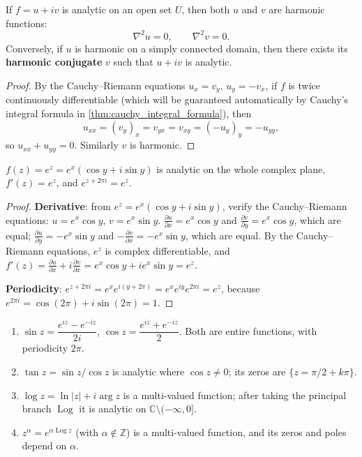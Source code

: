 \begin{corollary}\label{cor:harmonic_parts}
If $f = u + iv$ is analytic on an open set $U$, then both $u$ and $v$ are harmonic functions:
\[
\nabla^2 u = 0, \qquad \nabla^2 v = 0.
\]
Conversely, if $u$ is harmonic on a simply connected domain, then there exists its \textbf{harmonic conjugate} $v$ such that $u + iv$ is analytic.
\end{corollary}

\begin{proof}
By the Cauchy--Riemann equations $u_x = v_y$, $u_y = -v_x$, if $f$ is twice continuously differentiable (which will be guaranteed automatically by Cauchy's integral formula in \cref{thm:cauchy_integral_formula}), then
\[
u_{xx} = (v_y)_x = v_{yx} = v_{xy} = (-u_y)_y = -u_{yy},
\]
so $u_{xx} + u_{yy} = 0$. Similarly $v$ is harmonic.
\end{proof}

\begin{proposition}\label{prop:complex_exp_periodicity}
$f(z) = e^z = e^x(\cos y + i\sin y)$ is analytic on the whole complex plane, $f'(z) = e^z$, and $e^{z + 2\pi i} = e^z$.
\end{proposition}

\begin{proof}
\textbf{Derivative}: from $e^z = e^x(\cos y + i\sin y)$, verify the Cauchy--Riemann equations: $u = e^x\cos y$, $v = e^x\sin y$. $\frac{\partial u}{\partial x} = e^x\cos y$ and $\frac{\partial v}{\partial y} = e^x\cos y$, which are equal; $\frac{\partial u}{\partial y} = -e^x\sin y$ and $-\frac{\partial v}{\partial x} = -e^x\sin y$, which are equal. By the Cauchy--Riemann equations, $e^z$ is complex differentiable, and $f'(z) = \frac{\partial u}{\partial x} + i\frac{\partial v}{\partial x} = e^x\cos y + ie^x\sin y = e^z$.

\textbf{Periodicity}: $e^{z+2\pi i} = e^x e^{i(y+2\pi)} = e^x e^{iy} e^{2\pi i} = e^z$, because $e^{2\pi i} = \cos(2\pi) + i\sin(2\pi) = 1$.
\end{proof}

\begin{example}\label{ex:elementary_complex_functions}
\begin{enumerate}[label=(\roman*)]
    \item $\sin z = \dfrac{e^{iz} - e^{-iz}}{2i}$, $\cos z = \dfrac{e^{iz} + e^{-iz}}{2}$. Both are entire functions, with periodicity $2\pi$.
    \item $\tan z = \sin z / \cos z$ is analytic where $\cos z \neq 0$; its zeros are $\{z = \pi/2 + k\pi\}$.
    \item $\log z = \ln|z| + i\arg z$ is a multi-valued function; after taking the principal branch $\operatorname{Log}$ it is analytic on $\mathbb{C} \setminus (-\infty, 0]$.
    \item $z^\alpha = e^{\alpha \operatorname{Log} z}$ (with $\alpha \notin \mathbb{Z}$) is a multi-valued function, and its zeros and poles depend on $\alpha$.
\end{enumerate}
\end{example}

